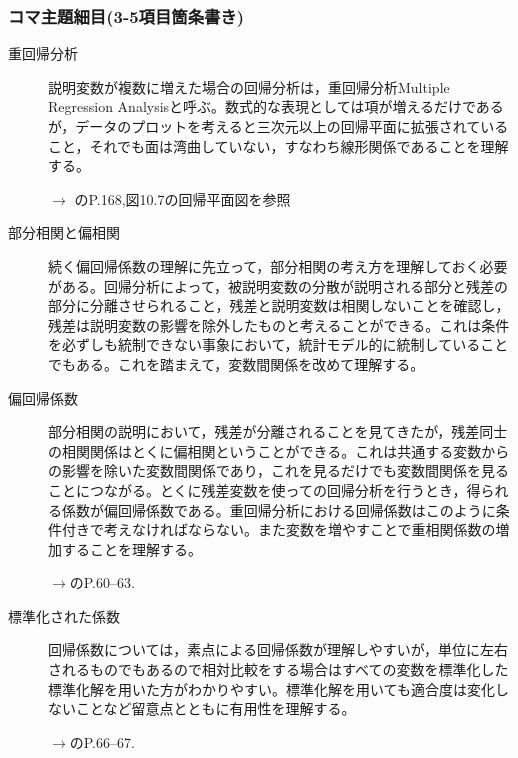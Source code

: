 \subsubsection{コマ主題細目(3-5項目箇条書き)}
\begin{description}


	\item[重回帰分析]説明変数が複数に増えた場合の回帰分析は，重回帰分析Multiple Regression Analysisと呼ぶ。数式的な表現としては項が増えるだけであるが，データのプロットを考えると三次元以上の回帰平面に拡張されていること，それでも面は湾曲していない，すなわち線形関係であることを理解する。
	      \begin{flushright}
		      $\to$ \textcite{kosugi2019}のP.168,図10.7の回帰平面図を参照
	      \end{flushright}

	\item[部分相関と偏相関] 続く偏回帰係数の理解に先立って，部分相関の考え方を理解しておく必要がある。回帰分析によって，被説明変数の分散が説明される部分と残差の部分に分離させられること，残差と説明変数は相関しないことを確認し，残差は説明変数の影響を除外したものと考えることができる。これは条件を必ずしも統制できない事象において，統計モデル的に統制していることでもある。これを踏まえて，変数間関係を改めて理解する。


	\item[偏回帰係数]部分相関の説明において，残差が分離されることを見てきたが，残差同士の相関関係はとくに偏相関ということができる。これは共通する変数からの影響を除いた変数間関係であり，これを見るだけでも変数間関係を見ることにつながる。とくに残差変数を使っての回帰分析を行うとき，得られる係数が偏回帰係数である。重回帰分析における回帰係数はこのように条件付きで考えなければならない。また変数を増やすことで重相関係数の増加することを理解する。
	      \begin{flushright}
		      $\to$\textcite{kosugi2018}のP.60--63.
	      \end{flushright}

	\item[標準化された係数]回帰係数については，素点による回帰係数が理解しやすいが，単位に左右されるものでもあるので相対比較をする場合はすべての変数を標準化した標準化解を用いた方がわかりやすい。標準化解を用いても適合度は変化しないことなど留意点とともに有用性を理解する。
	      \begin{flushright}
		      $\to$\textcite{kosugi2018}のP.66--67.
	      \end{flushright}




\end{description}
